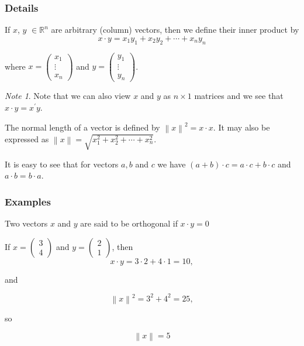 \documentclass[12pt,a4paper]{article}
\theoremstyle{regla}
\theoremstyle{remark}
\newtheorem{notes}{Note}[section]
\theoremstyle{definition}
\theoremstyle{nonumberbreak}
\begin{document}
\subsubsection{Details}
If $x$, $y$ $\in \mathbb{R}^n$ are arbitrary (column) vectors, then we define their inner product by
$$x \cdot y = x_1y_1 + x_2y_2 + \cdots + x_ny_n$$

where $x= \begin{pmatrix}
x_1\\
\vdots\\
x_n
\end{pmatrix}$ and $y =\begin{pmatrix}
y_1\\
\vdots\\
y_n
\end{pmatrix}$.
\begin{notes}
Note that we can also view $x$ and $y$ as $n \times 1$ matrices and we see that $x \cdot y = x^\prime y$.  
\end{notes}
\begin{defn}
The normal length of a vector is defined by $\left \| x \right \|^2 = x \cdot x$.  It may also be expressed as $\left \| x \right \| = \sqrt{x_1^2 + x_2^2 + \cdots + x_n^2}$. 
\end{defn}
It is easy to see that for vectors $a, b$ and $c$ we have $(a+b)\cdot c=a\cdot c+ b\cdot c$ and $a\cdot b=b\cdot a$.
\subsubsection{Examples}
Two vectors $x$ and $y$ are said to be orthogonal if $x \cdot y = 0$

\begin{xmpl}

If $ x= \begin{pmatrix}
3\\
4
\end{pmatrix}$ and $y= \begin{pmatrix}
2\\
1
\end{pmatrix}$, then $$x \cdot y = 3 \cdot 2 + 4 \cdot 1 = 10,$$

and

$$\left \| x \right \|^2 = 3^2 + 4^2 = 25,$$

so

$$\left\| x \right \| = 5$$

\end{xmpl}

\end{document}
